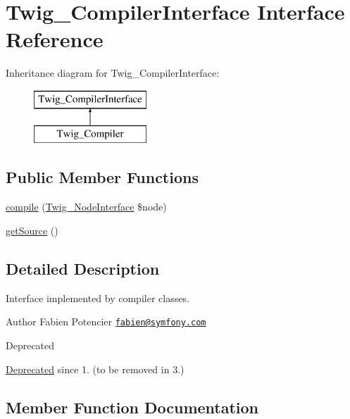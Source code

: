 \hypertarget{interfaceTwig__CompilerInterface}{}\section{Twig\+\_\+\+Compiler\+Interface Interface Reference}
\label{interfaceTwig__CompilerInterface}
Inheritance diagram for Twig\+\_\+\+Compiler\+Interface\+:\begin{figure}[H]
\begin{center}
\leavevmode
\includegraphics[height=2.000000cm]{interfaceTwig__CompilerInterface}
\end{center}
\end{figure}
\subsection*{Public Member Functions}
\begin{DoxyCompactItemize}
\item 
\hyperlink{interfaceTwig__CompilerInterface_a722064922d6d385a8115a9f4396788f2}{compile} (\hyperlink{interfaceTwig__NodeInterface}{Twig\+\_\+\+Node\+Interface} \$node)
\item 
\hyperlink{interfaceTwig__CompilerInterface_a22f7a974692dbe3c97020bde81f337f5}{get\+Source} ()
\end{DoxyCompactItemize}


\subsection{Detailed Description}
Interface implemented by compiler classes.

\begin{DoxyAuthor}{Author}
Fabien Potencier \href{mailto:fabien@symfony.com}{\tt fabien@symfony.\+com}
\end{DoxyAuthor}
\begin{DoxyRefDesc}{Deprecated}
\item[\hyperlink{deprecated__deprecated000003}{Deprecated}]since 1. (to be removed in 3.) \end{DoxyRefDesc}


\subsection{Member Function Documentation}
